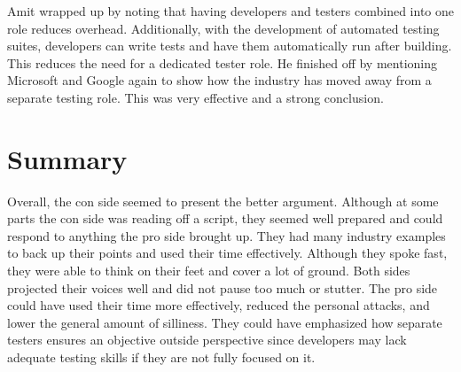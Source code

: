 \documentclass[letterpaper,twocolumn,10pt]{article}
\begin{document}
Amit wrapped up by noting that having developers and testers combined into one role reduces overhead. Additionally,
with the development of automated testing suites, developers can write tests and have them automatically run after building.
This reduces the need for a dedicated tester role. He finished off by mentioning Microsoft and Google again to show how
the industry has moved away from a separate testing role. This was very effective and a strong conclusion.

\section{Summary}

Overall, the con side seemed to present the better argument. Although at some parts the con side was reading off a script, they seemed well
prepared and could respond to anything the pro side brought up. They had many industry examples to back up their points and used
their time effectively. Although they spoke fast, they were able to think on their feet and cover a lot of ground. Both sides projected
their voices well and did not pause too much or stutter. The pro side could have used their time more effectively, reduced the personal
attacks, and lower the general amount of silliness. They could have emphasized how separate testers ensures an objective outside perspective
since developers may lack adequate testing skills if they are not fully focused on it.
\end{document}
